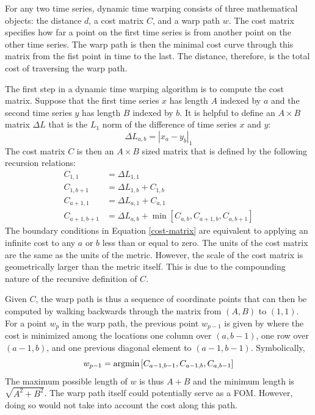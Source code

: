 For any two time series, dynamic time warping consists of three mathematical objects:
the distance $d$, a cost matrix $C$, and a warp path $w$. The cost matrix 
specifies how far a point on the first time series is from another point on the 
other time series.  The warp path is then the minimal cost curve through this 
matrix from the fist point in time to the last. The distance, therefore, is the
total cost of traversing the warp path.

The first step in a dynamic time warping algorithm is to compute the cost matrix. 
Suppose that the first 
time series $x$ has length $A$ indexed by $a$ and the second time series $y$ has 
length $B$ indexed by $b$. It is helpful to define an $A\times B$ matrix $\Delta L$
that is the $L_1$ norm of the difference of time series $x$ and $y$:
\begin{equation}
\label{delta-l1}
\Delta L_{a,b} = \left|x_a - y_b\right|_1
\end{equation}
The cost matrix $C$ is then an $A\times B$ sized matrix that is defined by the 
following recursion relations:
\begin{equation}
\label{cost-matrix}
\begin{split}
C_{1,1} & = \Delta L_{1,1}\\
C_{1,b+1} & = \Delta L_{1,b} + C_{1,b}\\
C_{a+1,1} & = \Delta L_{a,1} + C_{a,1}\\
C_{a+1,b+1} & = \Delta L_{a,b} + \min\left[C_{a,b}, C_{a+1,b}, C_{a,b+1}\right]
\end{split}
\end{equation}
The boundary conditions in Equation \ref{cost-matrix} are equivalent 
to applying an infinite cost to any $a$ or $b$ less than or equal to zero.
The units of the cost matrix are the same as the units of the metric. However, the 
scale of the cost matrix is geometrically larger than the metric itself. This is
due to the compounding nature of the recursive definition of $C$.

Given $C$, the warp path is thus a sequence of coordinate points that can then be 
computed by walking backwards through the matrix from $(A, B)$ to $(1, 1)$.
For a point $w_p$ in the warp path, the previous point $w_{p-1}$ is given by 
where the cost is minimized among the locations one column over $(a,b-1)$, 
one row over $(a-1,b)$, and one previous diagonal element to $(a-1,b-1)$. 
Symbolically, 
\begin{equation}
\label{warp-path}
w_{p-1} = \mathrm{argmin}\left[C_{a-1,b-1}, C_{a-1,b}, C_{a,b-1}\right]
\end{equation}
The maximum possible length of $w$ is thus $A + B$ and the minimum length is 
$\sqrt{A^2 + B^2}$. The warp path itself could potentially serve as a FOM.  
However, doing so would not take into account the cost along this path.

